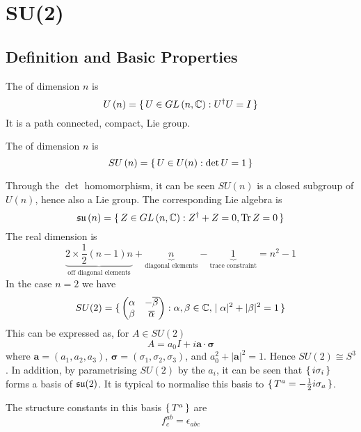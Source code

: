 \documentclass{article}
\begin{document}
\section{SU(2)}
\subsection{Definition and Basic Properties}

\begin{definition}[U($n$)]
	The  of dimension $n$ is 
	\[
	U\left(n\right)=\set{  U\in GL\left(n,\mathbb{C}\right) : U^\dagger U=I  }
	\]
	It is a path connected, compact, Lie group.
\end{definition}

\begin{definition}[SU($n$)]
	The  of dimension $n$ is
	\[
	SU\left(n\right)=\set{  U\in U(n) : \det{U}=1  }
	\]
\end{definition}
\noindent Through the $\det$ homomorphism, it can be seen $SU(n)$ is a closed subgroup of $U(n)$, hence also a Lie group.  The corresponding Lie algebra is 
\[
\mathfrak{su}\left(n\right)=\set{  Z\in GL\left(n,\mathbb{C}\right) : Z^\dagger+Z=0, \operatorname{Tr}{Z}=0  }
\]
The real dimension is
\[
\underbrace{2\times\frac{1}{2}(n-1)n}_{\text{off diagonal elements}}+\underbrace{n}_{\text{diagonal elements}}-\underbrace{1}_{\text{trace constraint}}=n^2-1
\]
In the case $n=2$ we have 
\[
SU(2)=\set{    \begin{pmatrix} \alpha & -\overline{\beta} \\ \beta & \overline{\alpha} \end{pmatrix}  : \alpha,\beta\in\mathbb{C} , |\alpha|^2+|\beta|^2=1   }
\]
This can be expressed as, for $A\in SU(2)$
\[
A=a_0 I +i\bm{a}\cdot\bm{\sigma}
\]
where $\bm{a}=(a_1, a_2, a_3)$, $\bm{\sigma}=(\sigma_1, \sigma_2, \sigma_3)$, and $a_0^2+|\bm{a}|^2=1$. Hence $SU(2)\cong S^3$. In addition, by parametrising $SU(2)$ by the $a_i$, it can be seen that $\set{  i\sigma_i }$ forms a basis of $\mathfrak{su}(2)$. It is typical to normalise this basis to $\set{  T^a=-\frac{1}{2} i\sigma_a  }$. 

\begin{fact}
	The structure constants in this basis $\set{  T^a  }$ are 
	\[
	f^{ab}_c=\epsilon_{abc}
	\]
\end{fact}
\end{document}
